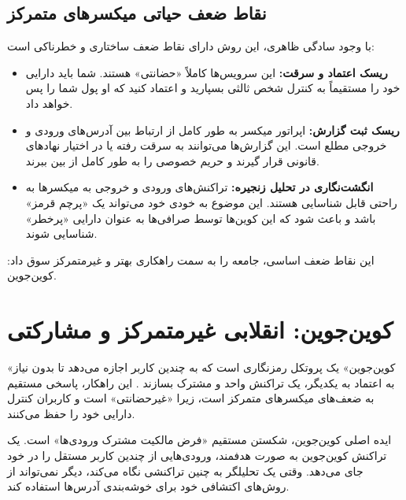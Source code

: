 \subsection{نقاط ضعف حیاتی میکسرهای متمرکز}
با وجود سادگی ظاهری، این روش دارای نقاط ضعف ساختاری و خطرناکی است:
\begin{itemize}
	\item \textbf{ریسک اعتماد و سرقت:} این سرویس‌ها کاملاً «حضانتی» هستند. شما باید دارایی خود را مستقیماً به کنترل شخص ثالثی بسپارید و اعتماد کنید که او پول شما را پس خواهد داد.
	
	\item \textbf{ریسک ثبت گزارش:} اپراتور میکسر به طور کامل از ارتباط بین آدرس‌های ورودی و خروجی مطلع است. این گزارش‌ها می‌توانند به سرقت رفته یا در اختیار نهادهای قانونی قرار گیرند و حریم خصوصی را به طور کامل از بین ببرند.
	
	\item \textbf{انگشت‌نگاری در تحلیل زنجیره:} تراکنش‌های ورودی و خروجی به میکسرها به راحتی قابل شناسایی هستند. این موضوع به خودی خود می‌تواند یک «پرچم قرمز» باشد و باعث شود که این کوین‌ها توسط صرافی‌ها به عنوان دارایی «پرخطر» شناسایی شوند.
\end{itemize}
این نقاط ضعف اساسی، جامعه را به سمت راهکاری بهتر و غیرمتمرکز سوق داد: کوین‌جوین.

\section{کوین‌جوین: انقلابی غیرمتمرکز و مشارکتی}

«کوین‌جوین» یک پروتکل رمزنگاری است که به چندین کاربر اجازه می‌دهد تا بدون نیاز به اعتماد به یکدیگر، یک تراکنش واحد و مشترک بسازند \cite{maxwell_coinjoin}. این راهکار، پاسخی مستقیم به ضعف‌های میکسرهای متمرکز است، زیرا «غیرحضانتی» است و کاربران کنترل دارایی خود را حفظ می‌کنند.

ایده اصلی کوین‌جوین، شکستن مستقیم «فرض مالکیت مشترک ورودی‌ها» است. یک تراکنش کوین‌جوین به صورت هدفمند، ورودی‌هایی از چندین کاربر مستقل را در خود جای می‌دهد. وقتی یک تحلیلگر به چنین تراکنشی نگاه می‌کند، دیگر نمی‌تواند از روش‌های اکتشافی خود برای خوشه‌بندی آدرس‌ها استفاده کند.

